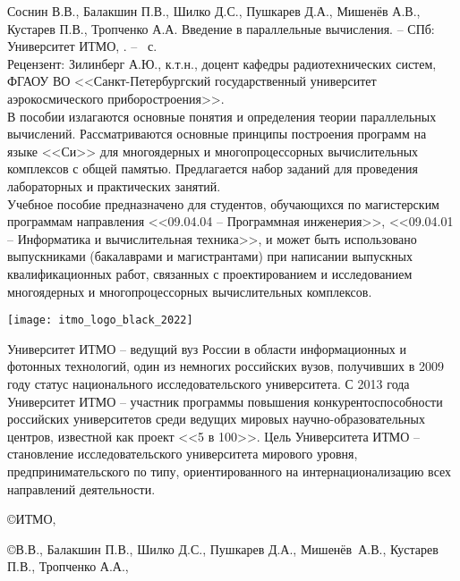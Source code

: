 \thispagestyle{empty}
 
Соснин В.В., Балакшин П.В., Шилко Д.С., Пушкарев Д.А., \linebreak Мишенёв А.В., Кустарев П.В., Тропченко А.А. Введение в параллельные вычисления. -- СПб: Университет ИТМО, \the\year. -- \pageref{LastPage}~с. \\

Рецензент: Зилинберг А.Ю., к.т.н., доцент кафедры радиотехнических систем, ФГАОУ ВО <<Санкт-Петербургский государственный университет аэрокосмического приборостроения>>. \\

В пособии излагаются основные понятия и определения теории параллельных вычислений. Рассматриваются основные принципы построения программ на языке <<Си>> для многоядерных и многопроцессорных вычислительных комплексов с общей памятью. Предлагается набор заданий для проведения лабораторных и практических занятий. \\

Учебное пособие предназначено для студентов, обучающихся по магистерским программам направления <<09.04.04 -- Программная инженерия>>, <<09.04.01 -- Информатика и вычислительная техника>>, и может быть использовано выпускниками (бакалаврами и магистрантами) при написании выпускных квалификационных работ, связанных с проектированием и исследованием многоядерных и многопроцессорных вычислительных комплексов.

\vspace*{\fill}

\begin{flushright}
    \texttt{[image: itmo\_logo\_black\_2022]}
\end{flushright}

Университет ИТМО – ведущий вуз России в области информационных и фотонных технологий, один из немногих российских вузов, получивших в 2009 году статус национального исследовательского университета. С 2013 года Университет ИТМО -- участник программы повышения конкурентоспособности российских университетов среди ведущих мировых научно-образовательных центров, известной как проект <<5 в 100>>. Цель Университета ИТМО -- становление исследовательского университета мирового уровня, предпринимательского по типу, ориентированного на интернационализацию всех направлений деятельности.
\begin{flushright}
    \copyright{} ИТМО, \the\year
    
    \copyright{} В.В., Балакшин П.В., Шилко Д.С., Пушкарев Д.А.,
    Мишенёв~А.В., Кустарев П.В., Тропченко А.А., \the\year
\end{flushright}
